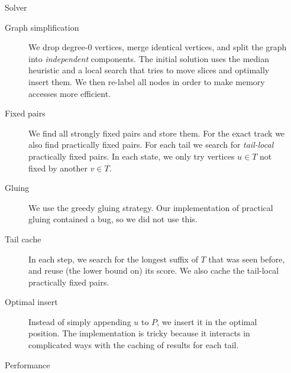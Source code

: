 \documentclass[final]{beamer}
\newlength{\sepwidth}
\newlength{\colwidth}
\newcommand{\separatorcolumn}{\begin{column}{\sepwidth}\end{column}}
\theoremstyle{remark}
\begin{document}
\begin{frame}[t]
\begin{columns}[t]
\begin{column}{\colwidth}
\begin{block}{Solver}
        \begin{description}
        \item[Graph simplification] We drop degree-$0$ vertices, merge identical
          vertices, and split the graph into \emph{independent} components.
          The initial solution uses the median heuristic and a local search that tries to move
          slices and optimally insert them. We then re-label all nodes in order to make
          memory accesses more efficient.
        \item[Fixed pairs] We find all strongly fixed pairs and store them. For the
          exact track we also find practically fixed pairs.
          For each tail we search for \emph{tail-local} practically fixed pairs. In each state, we only
          try vertices $u\in T$ not fixed by another $v\in T$.
        \item[Gluing] We use the greedy gluing strategy. Our implementation
          of practical gluing contained a bug, so we did not use this.
        \item[Tail cache] In each step, we search for the longest suffix of $T$ that
          was seen before, and reuse (the lower bound on) its score. We also
          cache the tail-local practically fixed pairs.
        \item[Optimal insert] Instead of simply appending $u$ to $P$, we
          insert it in the optimal position. The
          implementation is tricky because it interacts in complicated ways with
          the caching of results for each tail.
        \end{description}
      \end{block}

      \begin{block}{Performance}

      \end{block}


    \end{column}
    \separatorcolumn
  \end{columns}
\end{frame}
\end{document}
